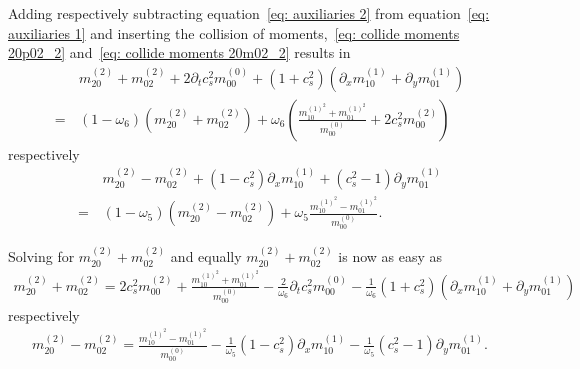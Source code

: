 Adding respectively subtracting equation~\eqref{eq: auxiliaries 2} from equation~\eqref{eq: auxiliaries 1} and inserting the collision of
moments,~\eqref{eq: collide moments 20p02_2} and~\eqref{eq: collide moments 20m02_2} results in
\begin{align}
  \label{eq: auxiliaries 4}
  &m_{20}^{(2)} + m_{02}^{(2)} + 2\partial_t c_s^2 m_{00}^{(0)} + (1+c_s^2)(\partial_x m_{10}^{(1)} + \partial_y m_{01}^{(1)})
  \\=\,&
  (1-\omega_6)\left(  m_{20}^{(2)} + m_{02}^{(2)}\right)
  + \omega_6 \left( \frac{ m_{10}^{{(1)}^2} + m_{01}^{{(1)}^2}}{m_{00}^{(0)}}
  + 2 c_s^2 m_{00}^{(2)} \right)
\end{align}
respectively
\begin{align}
  \label{eq: auxiliaries 5}
  &m_{20}^{(2)} - m_{02}^{(2)} + (1 - c_s^2)\partial_x m_{10}^{(1)} + (c_s^2 - 1)\partial_y m_{01}^{(1)}
  \\=\,&
  (1-\omega_5) \left(m_{20}^{(2)}-m_{02}^{(2)}\right) + \omega_5 \frac{ m_{10}^{{(1)}^2} - m_{01}^{{(1)}^2}}{m_{00}^{(0)}}.
\end{align}

Solving for $m_{20}^{(2)} + m_{02}^{(2)}$ and equally $m_{20}^{(2)} + m_{02}^{(2)}$ is now as easy as
\begin{align}
  \label{eq: auxiliaries 6}
  m_{20}^{(2)} + m_{02}^{(2)}
  =
  2 c_s^2 m_{00}^{(2)}
  + \frac{ m_{10}^{{(1)}^2} + m_{01}^{{(1)}^2}}{m_{00}^{(0)}}
  - \frac{2}{\omega_6}\partial_t c_s^2 m_{00}^{(0)}
  - \frac{1}{\omega_6}(1+c_s^2)(\partial_x m_{10}^{(1)} + \partial_y m_{01}^{(1)})
\end{align}
respectively
\begin{align}
  \label{eq: auxiliaries 7}
  m_{20}^{(2)} - m_{02}^{(2)}
  =
   \frac{ m_{10}^{{(1)}^2} - m_{01}^{{(1)}^2}}{m_{00}^{(0)}}
   - \frac{1}{\omega_5} (1 - c_s^2)\partial_x m_{10}^{(1)}
   - \frac{1}{\omega_5} (c_s^2 - 1)\partial_y m_{01}^{(1)}.
\end{align}

